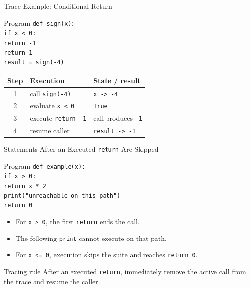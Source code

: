 \documentclass[aspectratio=169,10pt]{beamer}
\begin{document}
\begin{frame}{Trace Example: Conditional Return}
  \begin{block}{Program}
    \texttt{def sign(x):}\\
    \hspace*{0.20in}\texttt{if x < 0:}\\
    \hspace*{0.40in}\texttt{return -1}\\
    \hspace*{0.20in}\texttt{return 1}\\[0.08in]
    \texttt{result = sign(-4)}
  \end{block}

  \begin{center}
    \renewcommand{\arraystretch}{1.18}
    \begin{tabular}{c|l|l}
      \textbf{Step} & \textbf{Execution} & \textbf{State / result} \\\hline
      1 & call \texttt{sign(-4)} & \texttt{x -> -4} \\
      2 & evaluate \texttt{x < 0} & \texttt{True} \\
      3 & execute \texttt{return -1} & call produces \texttt{-1} \\
      4 & resume caller & \texttt{result -> -1}
    \end{tabular}
  \end{center}
\end{frame}

\begin{frame}{Statements After an Executed \texttt{return} Are Skipped}
  \begin{block}{Program}
    \texttt{def example(x):}\\
    \hspace*{0.20in}\texttt{if x > 0:}\\
    \hspace*{0.40in}\texttt{return x * 2}\\
    \hspace*{0.40in}\texttt{print("unreachable on this path")}\\
    \hspace*{0.20in}\texttt{return 0}
  \end{block}

  \begin{itemize}
    \item For \texttt{x > 0}, the first \texttt{return} ends the call.
    \item The following \texttt{print} cannot execute on that path.
    \item For \texttt{x <= 0}, execution skips the suite and reaches \texttt{return 0}.
  \end{itemize}

  \begin{alertblock}{Tracing rule}
    After an executed \texttt{return}, immediately remove the active call from the trace and resume the caller.
  \end{alertblock}
\end{frame}
\end{document}
